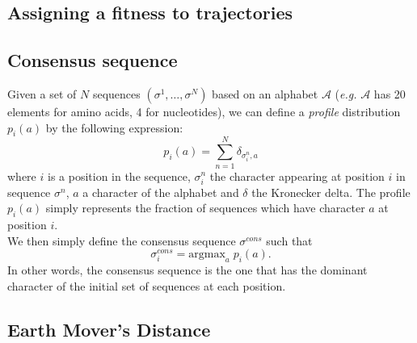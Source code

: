 \documentclass[reprint,amsmath,amssymb,superscriptaddress,showpacs,rmp]{revtex4-1}
\begin{document}
\subsection*{Assigning a fitness to trajectories} %
\label{sub:assigning_a_fitness_to_trajectories}


\subsection*{Consensus sequence} %
\label{sub:consensus_sequence}
	Given a set of $N$ sequences $(\sigma^1,\ldots,\sigma^N)$ based on an alphabet $\mathcal{A}$ (\emph{e.g.} $\mathcal{A}$ has 20 elements for amino acids, 4 for nucleotides), we can define a \emph{profile} distribution $p_i(a)$ by the following expression:
	$$ p_i(a) = \sum_{n=1}^N \delta_{\sigma^n_i,a} $$
	where $i$ is a position in the sequence, $\sigma^n_i$ the character appearing at position $i$ in sequence $\sigma^n$, $a$ a character of the alphabet and $\delta$ the Kronecker delta. The profile $p_i(a)$ simply represents the fraction of sequences which have character $a$ at position $i$. \\
	We then simply define the consensus sequence $\sigma^{cons}$ such that
	$$\sigma^{cons}_i = \text{argmax}_a \;p_i(a).$$
	In other words, the consensus sequence is the one that has the dominant character of the initial set of sequences at each position.

\subsection*{Earth Mover's Distance} %
\label{sub:earth_mover_s_distance}
\end{document}
